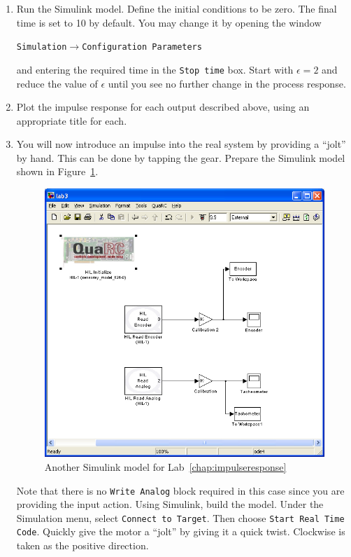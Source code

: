 \begin{enumerate}
    \item Run the \textsf{Simulink} model. Define the initial conditions to be
          zero.  The final time is set to 10 by default.  You may change it by opening
          the window
          \begin{center}
              \verb|Simulation|\(\rightarrow \)\verb|Configuration Parameters|
          \end{center}
          and entering the required time in the \verb|Stop time| box.  Start with
          \(\epsilon=2\) and reduce the value of \(\epsilon \) until you see no further
          change in the process response.

    \item Plot the impulse response for each output described above, using an
          appropriate title for each.

    \item You will now introduce an impulse into the real system by providing a
          ``jolt'' by hand. This can be done by tapping the gear.  Prepare the
          \textsf{Simulink} model shown in Figure~\ref{fig:model3a}.
          \begin{figure}[htbp]
              \centering
              \includegraphics[width=0.6\hsize]{pix/lab3a.jpg}
              \caption{Another \textsf{Simulink} model for Lab~\ref{chap:impulseresponse}}\label{fig:model3a}
          \end{figure}%
          Note that there is no \verb|Write Analog| block required in this case since you are providing the input action.  Using \textsf{Simulink}\@, build the model. Under the Simulation menu, select \verb|Connect to Target|. Then choose \verb|Start Real Time Code|.  Quickly give the motor a ``jolt'' by giving it a quick twist.  Clockwise is taken as the positive direction.


\end{enumerate}
